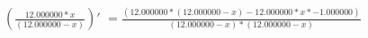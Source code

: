 \documentclass[a4paper, 12 pt]{article}
\begin{document}
	$\left(\frac{12.000000*x}{(12.000000-x)}\right)'$
	$= \frac{(12.000000*(12.000000-x)-12.000000*x*-1.000000)}{(12.000000-x)*(12.000000-x)}$
\end{document}
